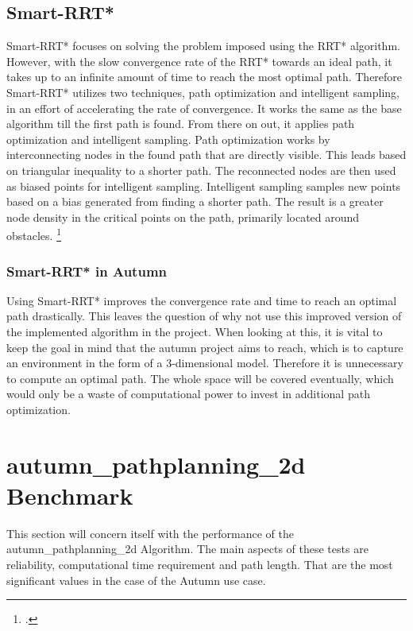 \subsection{Smart-RRT*}

Smart-RRT* focuses on solving the problem imposed using the RRT* algorithm. However, with the slow convergence rate of the RRT* towards an ideal path, it takes up to an infinite amount of time to reach the most optimal path. Therefore Smart-RRT* utilizes two techniques, path optimization and intelligent sampling, in an effort of accelerating the rate of convergence. 
It works the same as the base algorithm till the first path is found. From there on out, it applies path optimization and intelligent sampling. Path optimization works by interconnecting nodes in the found path that are directly visible. This leads based on triangular inequality to a shorter path. The reconnected nodes are then used as biased points for intelligent sampling. Intelligent sampling samples new points based on a bias generated from finding a shorter path. The result is a greater node density in the critical points on the path, primarily located around obstacles.  
\footcite{Islam2012}

\subsubsection{Smart-RRT* in Autumn}
Using Smart-RRT* improves the convergence rate and time to reach an optimal path drastically. This leaves the question of why not use this improved version of the implemented algorithm in the project. When looking at this, it is vital to keep the goal in mind that the autumn project aims to reach, which is to capture an environment in the form of a 3-dimensional model. Therefore it is unnecessary to compute an optimal path. The whole space will be covered eventually, which would only be a waste of computational power to invest in additional path optimization. 

\section{autumn\_pathplanning\_2d Benchmark}

This section will concern itself with the performance of the autumn\_pathplanning\_2d Algorithm. The main aspects of these tests are reliability, computational time requirement and path length. That are the most significant values in the case of the Autumn use case.

